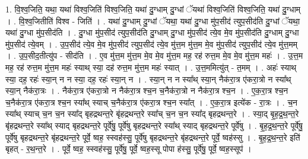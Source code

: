 \documentclass[17pt]{extarticle}
\begin{document}
1. वि॒श्व॒जिति॒ यथा॒ यथा॑ विश्व॒जिति॑ विश्व॒जिति॒ यथा॑ दु॒ग्धाम् दु॒ग्धां ॅयथा॑ विश्व॒जिति॑ विश्व॒जिति॒ यथा॑ दु॒ग्धाम् । . वि॒श्व॒जितीति॑ विश्व - जिति॑ । . यथा॑ दु॒ग्धाम् दु॒ग्धां ॅयथा॒ यथा॑ दु॒ग्धा मु॑प॒सीद॑ त्युप॒सीद॑ति दु॒ग्धां ॅयथा॒ यथा॑ दु॒ग्धा मु॑प॒सीद॑ति । . दु॒ग्धा मु॑प॒सीद॑ त्युप॒सीद॑ति दु॒ग्धाम् दु॒ग्धा मु॑प॒सीद॑ त्ये॒व मे॒व मु॑प॒सीद॑ति दु॒ग्धाम् दु॒ग्धा मु॑प॒सीद॑ त्ये॒वम् । . उ॒प॒सीद॑ त्ये॒व मे॒व मु॑प॒सीद॑ त्युप॒सीद॑ त्ये॒व मु॑त्त॒म मु॑त्त॒म मे॒व मु॑प॒सीद॑ त्युप॒सीद॑ त्ये॒व मु॑त्त॒मम् । . उ॒प॒सीद॒तीत्यु॑प - सीद॑ति । . ए॒व मु॑त्त॒म मु॑त्त॒म मे॒व मे॒व मु॑त्त॒म मह॒ रह॑ रुत्त॒म मे॒व मे॒व मु॑त्त॒म महः॑ । . उ॒त्त॒म मह॒ रह॑ रुत्त॒म मु॑त्त॒म महः॑ स्याथ् स्या॒ दह॑ रुत्त॒म मु॑त्त॒म महः॑ स्यात् । . उ॒त्त॒ममित्यु॑त् - त॒मम् । . अहः॑ स्याथ् स्या॒ दह॒ रहः॑ स्या॒न् न न स्या॒ दह॒ रहः॑ स्या॒न् न । . स्या॒न् न न स्या᳚थ् स्या॒न् नैक॑रा॒त्र ए॑करा॒त्रो न स्या᳚थ् स्या॒न् नैक॑रा॒त्रः । . नैक॑रा॒त्र ए॑करा॒त्रो न नैक॑रा॒त्र श्च॒न च॒नैक॑रा॒त्रो न नैक॑रा॒त्र श्च॒न । . ए॒क॒रा॒त्र श्च॒न च॒नैक॑रा॒त्र ए॑करा॒त्र श्च॒न स्या᳚थ् स्याच् च॒नैक॑रा॒त्र ए॑करा॒त्र श्च॒न स्या᳚त् । . ए॒क॒रा॒त्र इत्ये॑क - रा॒त्रः । . च॒न स्या᳚थ् स्याच् च॒न च॒न स्या᳚द् बृहद्रथन्त॒रे बृ॑हद्रथन्त॒रे स्या᳚च् च॒न च॒न स्या᳚द् बृहद्रथन्त॒रे । . स्या॒द् बृ॒ह॒द्र॒थ॒न्त॒रे बृ॑हद्रथन्त॒रे स्या᳚थ् स्याद् बृहद्रथन्त॒रे पूर्वे॑षु॒ पूर्वे॑षु बृहद्रथन्त॒रे स्या᳚थ् स्याद् बृहद्रथन्त॒रे पूर्वे॑षु । . बृ॒ह॒द्र॒थ॒न्त॒रे पूर्वे॑षु॒ पूर्वे॑षु बृहद्रथन्त॒रे बृ॑हद्रथन्त॒रे पूर्वे॒ ष्वह॒ स्स्वह॑स्सु॒ पूर्वे॑षु बृहद्रथन्त॒रे बृ॑हद्रथन्त॒रे पूर्वे॒ ष्वह॑स्सु । . बृ॒ह॒द्र॒थ॒न्त॒रे इति॑ बृहत् - र॒थ॒न्त॒रे । . पूर्वे॒ ष्वह॒ स्स्वह॑स्सु॒ पूर्वे॑षु॒ पूर्वे॒ ष्वह॒स्सू पोपा ह॑स्सु॒ पूर्वे॑षु॒ पूर्वे॒ ष्वह॒स्सूप॑ । \newline
\end{document}
